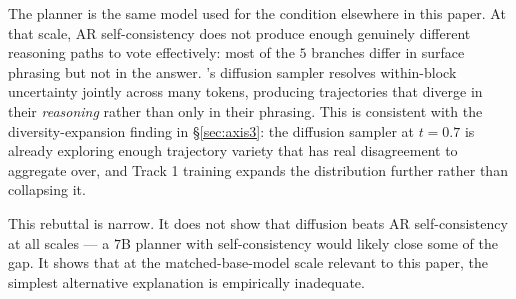 The  planner is the same model used for the
\cthree{} condition elsewhere in this paper.  At
that scale, AR self-consistency does not produce enough genuinely
different reasoning paths to vote effectively: most of the
$5$ branches differ in surface phrasing but not in the answer.
\LLaDA{}'s diffusion sampler resolves within-block uncertainty
jointly across many tokens, producing trajectories that diverge
in their \emph{reasoning} rather than only in their phrasing.
This is consistent with the diversity-expansion finding in
\S\ref{sec:axis3}: the diffusion sampler at $t{=}0.7$ is already
exploring enough trajectory variety that \cmaj{} has real
disagreement to aggregate over, and Track 1 training expands the
distribution further rather than collapsing it.

This rebuttal is narrow.  It does not show that diffusion
\cmaj{} beats AR self-consistency at all scales --- a $7$B
\Qwen{} planner with self-consistency would likely close some of
the gap.  It shows that at the matched-base-model scale relevant
to this paper, the simplest alternative explanation is empirically
inadequate.
